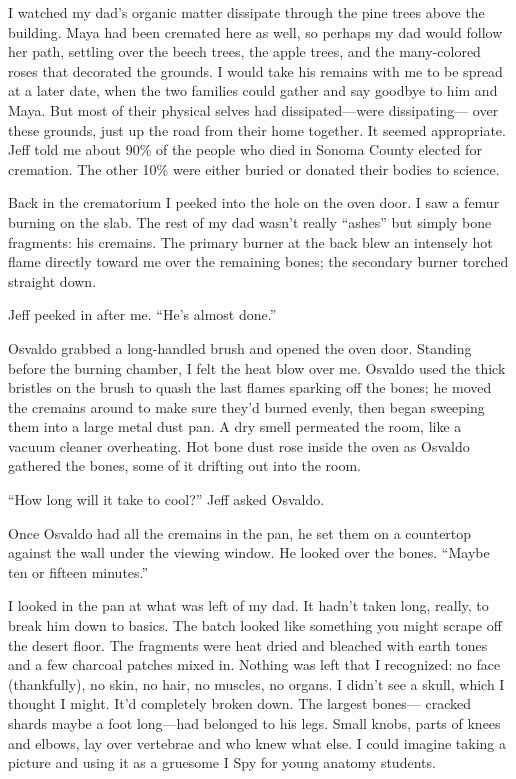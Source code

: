 \documentclass[12pt]{book}
\begin{document}
I watched my dad's organic matter dissipate through the pine trees above the building. Maya had been cremated here as well, so perhaps my dad would follow her path, settling over the beech trees, the apple trees, and the many-colored roses that decorated the grounds. I would take his remains with me to be spread at a later date, when the two families could gather and say goodbye to him and Maya. But most of their physical selves had dissipated---were dissipating--- over these grounds, just up the road from their home together. It seemed appropriate. Jeff told me about 90\% of the people who died in Sonoma County elected for cremation. The other 10\% were either buried or donated their bodies to science.

Back in the crematorium I peeked into the hole on the oven door. I saw a femur burning on the slab. The rest of my dad wasn't really ``ashes'' but simply bone fragments: his cremains. The primary burner at the back blew an intensely hot flame directly toward me over the remaining bones; the secondary burner torched straight down.

Jeff peeked in after me. ``He's almost done.''

Osvaldo grabbed a long-handled brush and opened the oven door. Standing before the burning chamber, I felt the heat blow over me. Osvaldo used the thick bristles on the brush to quash the last flames sparking off the bones; he moved the cremains around to make sure they'd burned evenly, then began sweeping them into a large metal dust pan. A dry smell permeated the room, like a vacuum cleaner overheating. Hot bone dust rose inside the oven as Osvaldo gathered the bones, some of it drifting out into the room.

``How long will it take to cool?'' Jeff asked Osvaldo.

Once Osvaldo had all the cremains in the pan, he set them on a countertop against the wall under the viewing window. He looked over the bones. ``Maybe ten or fifteen minutes.''

I looked in the pan at what was left of my dad. It hadn't taken long, really, to break him down to basics. The batch looked like something you might scrape off the desert floor. The fragments were heat dried and bleached with earth tones and a few charcoal patches mixed in. Nothing was left that I recognized: no face (thankfully), no skin, no hair, no muscles, no organs. I didn't see a skull, which I thought I might. It'd completely broken down. The largest bones--- cracked shards maybe a foot long---had belonged to his legs. Small knobs, parts of knees and elbows, lay over vertebrae and who knew what else. I could imagine taking a picture and using it as a gruesome I Spy for young anatomy students.
\end{document}
